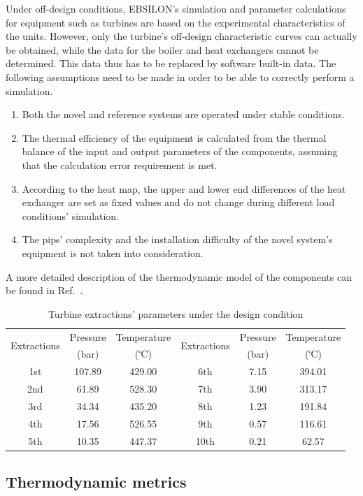 \documentclass[preprint,12pt]{elsarticle}
\begin{document}
Under off-design conditions, EBSILON's simulation and parameter calculations for equipment such as turbines are based on the experimental characteristics of the units.
However, only the turbine's off-design characteristic curves can actually be obtained, while the data for the boiler and heat exchangers cannot be determined.
This data thus has to be replaced by software built-in data.
The following assumptions need to be made in order to be able to correctly perform a simulation.
\begin{enumerate}[(1)]
\item Both the novel and reference systems are operated under stable conditions.
\item The thermal efficiency of the equipment is calculated from the thermal balance of the input and output parameters of the components, assuming that the calculation error requirement is met.
\item According to the heat map, the upper and lower end differences of the heat exchanger are set as fixed values and do not change during different load conditions' simulation.
\item The pips' complexity and the installation difficulty of the novel system's equipment is not taken into consideration.
\end{enumerate}
A more detailed description of the thermodynamic model of the components can be found in Ref.~\cite{Yao2017Multi}. 
\begin{table}
\caption{Turbine extractions' parameters under the design condition}
\label{table:extractions_parameter}
\begin{centering}
\begin{tabular}{cccccc}
\toprule 
\multirow{2}{*}{Extractions} & Pressure & Temperature & \multirow{2}{*}{Extractions} & Pressure & Temperature\tabularnewline
 & (bar) & (℃) &  & (bar) & (℃)\tabularnewline
\midrule
1st & 107.89  & 429.00 & 6th & 7.15  & 394.01 \tabularnewline
2nd & 61.89 & 528.30  & 7th & 3.90  & 313.17\tabularnewline
3rd & 34.34 & 435.20  & 8th & 1.23  & 191.84\tabularnewline
4th & 17.56  & 526.55  & 9th & 0.57  & 116.61\tabularnewline
5th & 10.35  & 447.37 & 10th & 0.21 & 62.57\tabularnewline
\bottomrule
\end{tabular}
\par\end{centering}
\end{table}

\subsection{Thermodynamic metrics} 
\label{ssub3:analsys method} 
\end{document}
